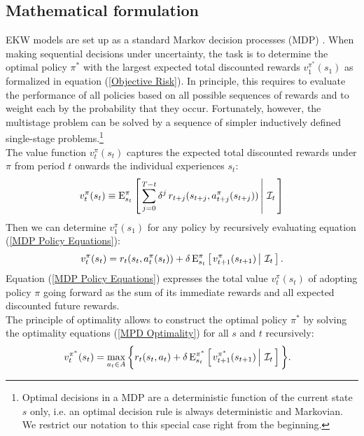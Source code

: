 \subsection{Mathematical formulation}\label{Mathematics}
EKW models are set up as a standard Markov decision processes (MDP) \citep{Puterman.1994,White.1993}. When making sequential decisions under uncertainty, the task is to determine the optimal policy $\pi^*$ with the largest expected total discounted rewards $v^{\pi^*}_1(s_1)$ as formalized in equation (\ref{Objective Risk}). In principle, this requires to evaluate the performance of all policies based on all possible sequences of rewards and to weight each by the probability that they occur. Fortunately, however, the multistage problem can be solved by a sequence of simpler inductively defined single-stage problems.\footnote{Optimal decisions in a MDP are a deterministic function of the current state $s$ only, i.e. an optimal decision rule is always deterministic and Markovian. We restrict our notation to this special case right from the beginning.}\\

\noindent The value function $v^\pi_t(s_t)$ captures the expected total discounted rewards under $\pi$ from period $t$ onwards the individual experiences $s_t$:
%
\begin{align*}
  v^\pi_t(s_t) \equiv \mathrm{E}_{s_t}^\pi\left[\left.\sum^{T - t}_{j = 0}  \delta^j\, r_{t + j}(s_{t + j}, a^\pi_{t + j}(s_{t + j})) \,\right\vert\,\mathcal{I}_t\,\right]
\end{align*}
%
Then we can determine $v_1^\pi(s_1)$ for any policy by recursively evaluating equation (\ref{MDP Policy Equations}):
%
\begin{align}\label{MDP Policy Equations}
v^\pi_t(s_t) = r_t(s_t,  a^\pi_t(s_t)) + \delta\,\mathrm{E}^\pi_{s_t} \left[\left.v^\pi_{t + 1}(s_{t + 1})  \,\right\vert\,\mathcal{I}_t\,\right].
\end{align}
%
Equation (\ref{MDP Policy Equations}) expresses the total value $v^\pi_t(s_t)$ of adopting policy $\pi$ going forward as the sum of its immediate rewards and all expected discounted future rewards.\\

\noindent The principle of optimality allows to construct the optimal policy $\pi^*$ by solving the optimality equations (\ref{MPD Optimality})  for all $s$ and $t$ recursively:
%
\begin{align}\label{MPD Optimality}
v^{\pi^*}_t(s_t)  & = \max_{a_t \in A}\bigg\{ r_t(s_t, a_t) + \delta\, \mathrm{E}^{\pi^*}_{s_t} \left[\left.v^{\pi^*}_{t + 1}(s_{t + 1})\,\right\vert\,\mathcal{I}_t\,\right] \bigg\}.
\end{align}

